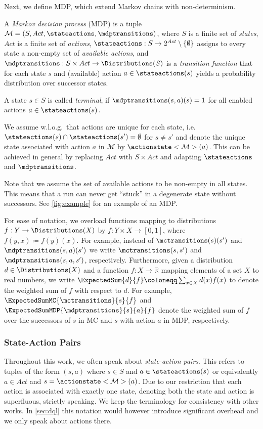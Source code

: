 \documentclass{article}
\newcommand{\intersectionSym}{\cap}
\newcommand{\intersectionBin}{\mathbin{\intersectionSym}}
\newcommand{\intersection}{\intersectionBin}
\newcommand{\Reals}{\mathbb{R}}
\newcommand{\distribution}{d}
\newcommand{\MDP}{\mathcal{M}}
\newcommand{\States}{S}
\newcommand{\Actions}{Act}
\begin{document}
Next, we define MDP, which extend Markov chains with non-determinism.
\begin{definition}
	A \emph{Markov decision process} (MDP) is a tuple $\MDP = (\States, \Actions, \stateactions, \mdptransitions)$, where
		$\States$ is a finite set of \emph{states},
		$\Actions$ is a finite set of \emph{actions},
		$\stateactions: \States \to 2^{\Actions} \setminus \{\emptyset\}$ assigns to every state a non-empty set of \emph{available actions}, and
		$\mdptransitions: \States \times \Actions \to \Distributions(\States)$ is a \emph{transition function} that for each state $s$ and (available) action $a \in \stateactions(s)$ yields a probability distribution over successor states.

	A state $s \in \States$ is called \emph{terminal}, if $\mdptransitions(s, a)(s) = 1$ for all enabled actions $a \in \stateactions(s)$.
\end{definition}
\begin{remark}
	We assume w.l.o.g.\ that actions are unique for each state, i.e.\ $\stateactions(s) \intersection \stateactions(s') = \emptyset$ for $s \neq s'$ and denote the unique state associated with action $a$ in $\MDP$ by $\actionstate<\MDP>(a)$.
	This can be achieved in general by replacing $\Actions$ with $\States \times \Actions$ and adapting $\stateactions$ and $\mdptransitions$.
\end{remark}
Note that we assume the set of available actions to be non-empty in all states.
This means that a run can never get \enquote{stuck} in a degenerate state without successors.
See \cref{fig:example} for an example of an MDP.

For ease of notation, we overload functions mapping to distributions $f: Y \to \Distributions(X)$ by $f: Y \times X \to [0, 1]$, where $f(y, x) \coloneqq f(y)(x)$.
For example, instead of $\mctransitions(s)(s')$ and $\mdptransitions(s, a)(s')$ we write $\mctransitions(s, s')$ and $\mdptransitions(s, a, s')$, respectively.
Furthermore, given a distribution $\distribution \in \Distributions(X)$ and a function $f : X \to \Reals$ mapping elements of a set $X$ to real numbers, we write $\ExpectedSum{\distribution}{f} \coloneqq \sum_{x \in X} \distribution(x) f(x)$ to denote the weighted sum of $f$ with respect to $\distribution$.
For example, $\ExpectedSumMC{\mctransitions}{s}{f}$ and $\ExpectedSumMDP{\mdptransitions}{s}{a}{f}$ denote the weighted sum of $f$ over the successors of $s$ in MC and $s$ with action $a$ in MDP, respectively.

\subsubsection*{State-Action Pairs}
Throughout this work, we often speak about \emph{state-action pairs}.
This refers to tuples of the form $(s, a)$ where $s \in \States$ and $a \in \stateactions(s)$ or equivalently $a \in \Actions$ and $s = \actionstate<\MDP>(a)$.
Due to our restriction that each action is associated with exactly one state, denoting both the state and action is superfluous, strictly speaking.
We keep the terminology for consistency with other works.
In \cref{sec:dql} this notation would however introduce significant overhead and we only speak about actions there.
\end{document}
